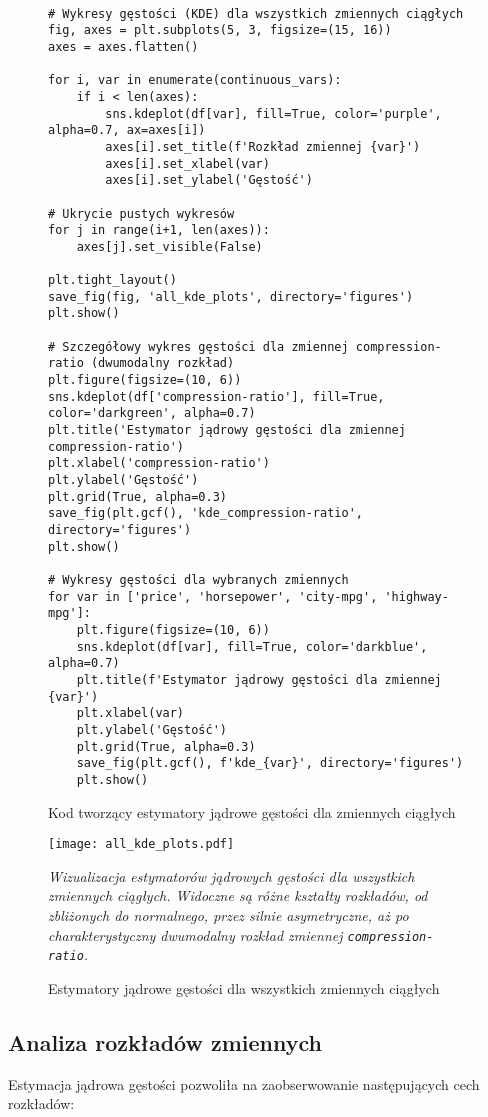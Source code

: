 \documentclass[12pt,a4paper]{article}
\newcommand{\kod}[2]{
    \begin{figure}[H]
        \begin{lstlisting}[style=pythonstyle]
#1
        \end{lstlisting}
        \caption{#2}
    \end{figure}
}
\begin{document}
\kod{
# Wykresy gęstości (KDE) dla wszystkich zmiennych ciągłych
fig, axes = plt.subplots(5, 3, figsize=(15, 16))
axes = axes.flatten()

for i, var in enumerate(continuous_vars):
    if i < len(axes):
        sns.kdeplot(df[var], fill=True, color='purple', alpha=0.7, ax=axes[i])
        axes[i].set_title(f'Rozkład zmiennej {var}')
        axes[i].set_xlabel(var)
        axes[i].set_ylabel('Gęstość')

# Ukrycie pustych wykresów
for j in range(i+1, len(axes)):
    axes[j].set_visible(False)

plt.tight_layout()
save_fig(fig, 'all_kde_plots', directory='figures')
plt.show()

# Szczegółowy wykres gęstości dla zmiennej compression-ratio (dwumodalny rozkład)
plt.figure(figsize=(10, 6))
sns.kdeplot(df['compression-ratio'], fill=True, color='darkgreen', alpha=0.7)
plt.title('Estymator jądrowy gęstości dla zmiennej compression-ratio')
plt.xlabel('compression-ratio')
plt.ylabel('Gęstość')
plt.grid(True, alpha=0.3)
save_fig(plt.gcf(), 'kde_compression-ratio', directory='figures')
plt.show()

# Wykresy gęstości dla wybranych zmiennych
for var in ['price', 'horsepower', 'city-mpg', 'highway-mpg']:
    plt.figure(figsize=(10, 6))
    sns.kdeplot(df[var], fill=True, color='darkblue', alpha=0.7)
    plt.title(f'Estymator jądrowy gęstości dla zmiennej {var}')
    plt.xlabel(var)
    plt.ylabel('Gęstość')
    plt.grid(True, alpha=0.3)
    save_fig(plt.gcf(), f'kde_{var}', directory='figures')
    plt.show()
}{Kod tworzący estymatory jądrowe gęstości dla zmiennych ciągłych}

\begin{figure}[H]
    \centering
    \texttt{[image: all\_kde\_plots.pdf]}
    \caption{Estymatory jądrowe gęstości dla wszystkich zmiennych ciągłych}
    \label{fig:all_kde_plots}
    \small\textit{Wizualizacja estymatorów jądrowych gęstości dla wszystkich zmiennych ciągłych. Widoczne są różne kształty rozkładów, od zbliżonych do normalnego, przez silnie asymetryczne, aż po charakterystyczny dwumodalny rozkład zmiennej \texttt{compression-ratio}.}
\end{figure}

\subsection{Analiza rozkładów zmiennych}

Estymacja jądrowa gęstości pozwoliła na zaobserwowanie następujących cech rozkładów:
\end{document}
